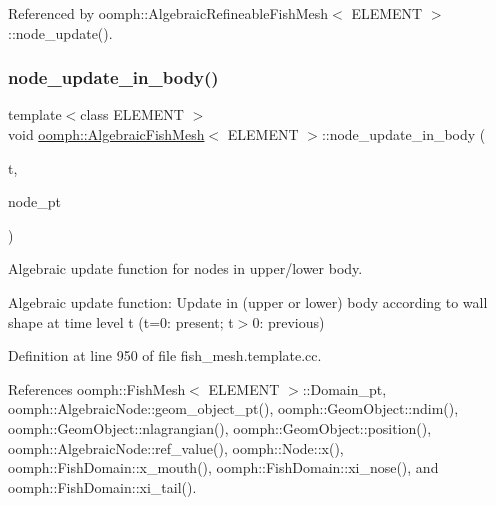 Referenced by oomph\+::\+Algebraic\+Refineable\+Fish\+Mesh$<$ E\+L\+E\+M\+E\+N\+T $>$\+::node\+\_\+update().

\mbox{\label{classoomph_1_1AlgebraicFishMesh_a4aee83d1b0a42418fe886b2f244c1d49}} 
\subsubsection{\texorpdfstring{node\+\_\+update\+\_\+in\+\_\+body()}{node\_update\_in\_body()}}
{\footnotesize\ttfamily template$<$class E\+L\+E\+M\+E\+NT $>$ \\
void \hyperlink{classoomph_1_1AlgebraicFishMesh}{oomph\+::\+Algebraic\+Fish\+Mesh}$<$ E\+L\+E\+M\+E\+NT $>$\+::node\+\_\+update\+\_\+in\+\_\+body (\begin{DoxyParamCaption}\item[{const unsigned \&}]{t,  }\item[{\hyperlink{classoomph_1_1AlgebraicNode}{Algebraic\+Node} $\ast$\&}]{node\+\_\+pt }\end{DoxyParamCaption})\hspace{0.3cm}{\ttfamily [protected]}}



Algebraic update function for nodes in upper/lower body. 

Algebraic update function\+: Update in (upper or lower) body according to wall shape at time level t (t=0\+: present; t$>$0\+: previous) 

Definition at line 950 of file fish\+\_\+mesh.\+template.\+cc.



References oomph\+::\+Fish\+Mesh$<$ E\+L\+E\+M\+E\+N\+T $>$\+::\+Domain\+\_\+pt, oomph\+::\+Algebraic\+Node\+::geom\+\_\+object\+\_\+pt(), oomph\+::\+Geom\+Object\+::ndim(), oomph\+::\+Geom\+Object\+::nlagrangian(), oomph\+::\+Geom\+Object\+::position(), oomph\+::\+Algebraic\+Node\+::ref\+\_\+value(), oomph\+::\+Node\+::x(), oomph\+::\+Fish\+Domain\+::x\+\_\+mouth(), oomph\+::\+Fish\+Domain\+::xi\+\_\+nose(), and oomph\+::\+Fish\+Domain\+::xi\+\_\+tail().

\mbox{\label{classoomph_1_1AlgebraicFishMesh_ad4a6f95e21e3d81b9defde90636e7d45}} 
